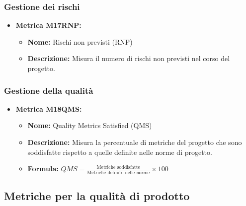 \subsubsection{Gestione dei rischi}
\begin{itemize}
    \item \textbf{Metrica M17RNP:}
          \begin{itemize}
              \item \textbf{Nome:} Rischi non previsti (RNP)
              \item \textbf{Descrizione:} Misura il numero di rischi
              non previsti nel corso del
              progetto.
          \end{itemize}
        \end{itemize}

        \subsubsection{Gestione della qualità}
        \begin{itemize}
            \item \textbf{Metrica M18QMS:}
                  \begin{itemize}
                      \item \textbf{Nome:} Quality Metrics Satisfied (QMS)
                      \item \textbf{Descrizione:} Misura la percentuale di metriche del progetto che sono soddisfatte rispetto a quelle definite nelle norme di progetto.
                      \item \textbf{Formula:} $QMS = \frac{\text{Metriche soddisfatte}}{\text{Metriche definite nelle norme}} \times 100$
                  \end{itemize}
        \end{itemize}
        
    
\subsection{Metriche per la qualità di prodotto}

